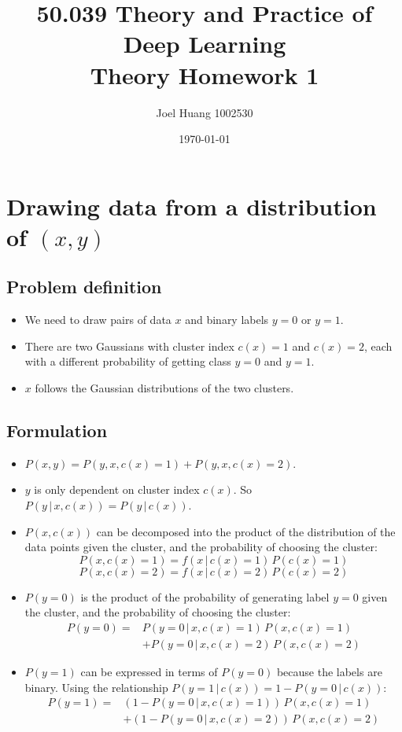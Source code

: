 \documentclass[9pt,twocolumn]{article}
\title{
	50.039 Theory and Practice of Deep Learning\\
	Theory Homework 1
}
\author{Joel Huang 1002530}
\date{\today}
\begin{document}
\maketitle

\section*{Drawing data from a distribution of $(x,y)$}
\subsection*{Problem definition}
\begin{itemize}
\item We need to draw pairs of data $x$ and binary labels $y=0$ or $y=1$.
\item There are two Gaussians with cluster index $c(x)=1$ and $c(x)=2$, each with a different probability of getting class $y=0$ and $y=1$.
\item $x$ follows the Gaussian distributions of the two clusters.
\end{itemize}

\subsection*{Formulation}
\begin{itemize}
\item $P(x,y)=P(y,x,c(x)=1)+P(y,x,c(x)=2)$.
\item $y$ is only dependent on cluster index $c(x)$. So $P(y\,|\,x,c(x))=P(y\,|\,c(x))$.
\item $P(x,c(x))$ can be decomposed into the product of the distribution of the data points given the cluster, and the probability of choosing the cluster:
\begin{equation*}
	P(x,c(x)=1) = f(x\,|\,c(x)=1)\,P(c(x)=1)
\end{equation*}
\begin{equation*}
	P(x,c(x)=2) = f(x\,|\,c(x)=2)\,P(c(x)=2)
\end{equation*}
\item $P(y=0)$ is the product of the probability of generating label $y=0$ given the cluster, and the probability of choosing the cluster:
\begin{equation*}
\begin{split}
	P(y=0) =&P(y=0\,|\,x,c(x)=1)\,P(x,c(x)=1) \\
	       &+P(y=0\,|\,x,c(x)=2)\,P(x,c(x)=2)
\end{split}
\end{equation*}
\item $P(y=1)$ can be expressed in terms of $P(y=0)$ because the labels are binary. Using the relationship $P(y=1\,|\,c(x)) = 1-P(y=0\,|\,c(x))$:
\begin{equation*}
\begin{split}
	P(y=1) = &(1-P(y=0\,|\,x,c(x)=1))\,P(x,c(x)=1) \\
	       & + (1-P(y=0\,|\,x,c(x)=2))\,P(x,c(x)=2)
\end{split}
\end{equation*}
\end{itemize}
\end{document}

